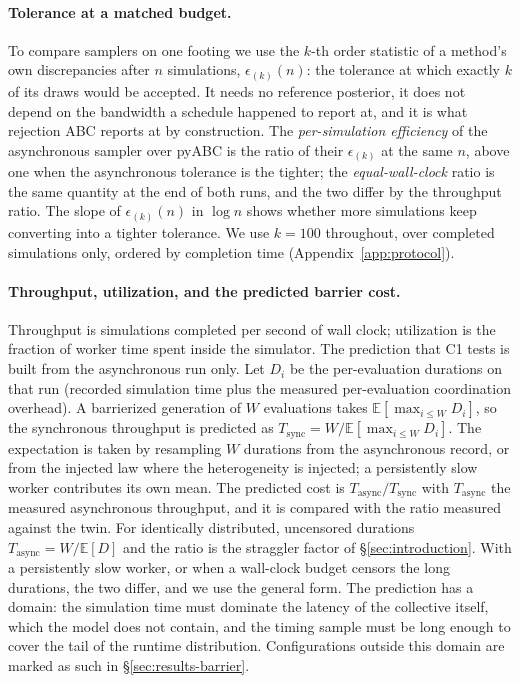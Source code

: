 \documentclass[10pt]{article}
\theoremstyle{plain}
\theoremstyle{definition}
\begin{document}
\paragraph{Tolerance at a matched budget.} To compare samplers on one footing we use the $k$-th order statistic of a method's own discrepancies after $n$ simulations, $\epsilon_{(k)}(n)$: the tolerance at which exactly $k$ of its draws would be accepted. It needs no reference posterior, it does not depend on the bandwidth a schedule happened to report at, and it is what rejection ABC reports at by construction. The \emph{per-simulation efficiency} of the asynchronous sampler over pyABC is the ratio of their $\epsilon_{(k)}$ at the same $n$, above one when the asynchronous tolerance is the tighter; the \emph{equal-wall-clock} ratio is the same quantity at the end of both runs, and the two differ by the throughput ratio. The slope of $\epsilon_{(k)}(n)$ in $\log n$ shows whether more simulations keep converting into a tighter tolerance. We use $k=100$ throughout, over completed simulations only, ordered by completion time (Appendix~\ref{app:protocol}).

\paragraph{Throughput, utilization, and the predicted barrier cost.} Throughput is simulations completed per second of wall clock; utilization is the fraction of worker time spent inside the simulator. The prediction that C1 tests is built from the asynchronous run only. Let $D_i$ be the per-evaluation durations on that run (recorded simulation time plus the measured per-evaluation coordination overhead). A barrierized generation of $W$ evaluations takes $\mathbb{E}[\max_{i\le W} D_i]$, so the synchronous throughput is predicted as $T_{\mathrm{sync}}=W/\mathbb{E}[\max_{i\le W}D_i]$. The expectation is taken by resampling $W$ durations from the asynchronous record, or from the injected law where the heterogeneity is injected; a persistently slow worker contributes its own mean. The predicted cost is $T_{\mathrm{async}}/T_{\mathrm{sync}}$ with $T_{\mathrm{async}}$ the measured asynchronous throughput, and it is compared with the ratio measured against the twin. For identically distributed, uncensored durations $T_{\mathrm{async}}=W/\mathbb{E}[D]$ and the ratio is the straggler factor of \S\ref{sec:introduction}. With a persistently slow worker, or when a wall-clock budget censors the long durations, the two differ, and we use the general form. The prediction has a domain: the simulation time must dominate the latency of the collective itself, which the model does not contain, and the timing sample must be long enough to cover the tail of the runtime distribution. Configurations outside this domain are marked as such in \S\ref{sec:results-barrier}.
\end{document}
